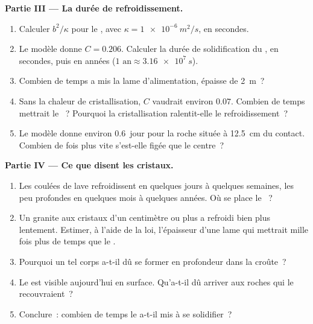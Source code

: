 \begin{problem}
\medskip
\noindent\textbf{Partie III --- La durée de refroidissement.}
\begin{enumerate}[resume]
  \item Calculer $b^2/\kappa$ pour le , avec
        $\kappa = \qty{1e-6}{m^2/s}$, en secondes.
  \item Le modèle donne $C = 0.206$. Calculer la durée de solidification
        du , en secondes, puis en années
        ($\num{1}\text{ an} \approx \qty{3.16e7}{s}$).
  \item Combien de temps a mis la lame d'alimentation, épaisse de
        \qty{2}{m}~?
  \item Sans la chaleur de cristallisation, $C$ vaudrait environ $0.07$.
        Combien de temps mettrait le ~? Pourquoi la cristallisation
        ralentit-elle le refroidissement~?
  \item Le modèle donne environ \num{0.6}~jour pour la roche située à
        \qty{12.5}{cm} du contact. Combien de fois plus vite s'est-elle
        figée que le centre~?
\end{enumerate}

\medskip
\noindent\textbf{Partie IV --- Ce que disent les cristaux.}
\begin{enumerate}[resume]
  \item Les coulées de lave refroidissent en quelques jours à quelques
        semaines, les  peu profondes en quelques mois à quelques
        années. Où se place le ~?
  \item Un granite aux cristaux d'un centimètre ou plus a refroidi bien
        plus lentement. Estimer, à l'aide de la loi, l'épaisseur d'une lame
        qui mettrait mille fois plus de temps que le .
  \item Pourquoi un tel corps a-t-il dû se former en profondeur dans la
        croûte~?
  \item Le  est visible aujourd'hui en surface. Qu'a-t-il dû arriver
        aux roches qui le recouvraient~?
  \item Conclure~: combien de temps le  a-t-il mis à se solidifier~?
\end{enumerate}
\end{problem}
